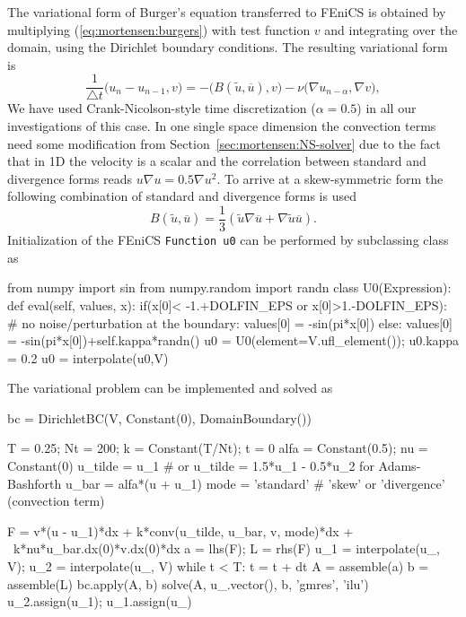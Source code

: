 The variational form of Burger's equation transferred to FEniCS is obtained by multiplying (\eqref{eq:mortensen:burgers}) with test function $v$ and integrating over the domain, using the Dirichlet boundary conditions. The resulting variational form is
\begin{equation}
 \frac{1}{\triangle t}\bigl( u_{n} - u_{n-1} , v\bigr) = - \bigl(B(\tilde{u},\overline{u}), v \bigr) - \nu \bigl( \nabla u_{n-\alpha}, \nabla v \bigr),
\label{eq:mortensen:burgers_vf}
\end{equation}
We have used Crank-Nicolson-style time discretization ($\alpha=0.5$) in all our investigations of this case. In one single space dimension the convection terms need some modification from Section~\ref{sec:mortensen:NS-solver} due to the fact that in 1D the velocity is a scalar and the correlation between standard and divergence forms reads $u\nabla u =0.5 \nabla u^2$. To arrive at a skew-symmetric form the following combination of standard and divergence forms is used
\begin{equation}
 B(\tilde{u},\overline{u}) = \frac{1}{3}\left( \tilde{u}\nabla \overline{u} + \nabla \tilde{u} \overline{u} \right).
\end{equation}
Initialization of the FEniCS
{\fontsize{12pt}{12pt}\texttt{Function u0}} can be performed by subclassing  class
 as
\begin{python}
from numpy import sin
from numpy.random import randn
class U0(Expression):
    def eval(self, values, x):
        if(x[0]< -1.+DOLFIN_EPS or x[0]>1.-DOLFIN_EPS):
            # no noise/perturbation at the boundary:
            values[0] = -sin(pi*x[0])
        else:
            values[0] = -sin(pi*x[0])+self.kappa*randn()
u0 = U0(element=V.ufl_element()); u0.kappa = 0.2
u0 = interpolate(u0,V)
\end{python}
The variational problem can be implemented and solved as
\begin{python}
bc = DirichletBC(V, Constant(0), DomainBoundary())

T = 0.25; Nt = 200; k = Constant(T/Nt); t = 0
alfa = Constant(0.5); nu = Constant(0)
u_tilde = u_1 # or u_tilde = 1.5*u_1 - 0.5*u_2 for Adams-Bashforth
u_bar = alfa*(u + u_1)
mode = 'standard'  # 'skew' or 'divergence' (convection term)

F = v*(u - u_1)*dx + k*conv(u_tilde, u_bar, v, mode)*dx + \
    k*nu*u_bar.dx(0)*v.dx(0)*dx
a = lhs(F); L = rhs(F)
u_1 = interpolate(u_, V); u_2 = interpolate(u_, V)
while t < T:
    t = t + dt
    A = assemble(a)
    b = assemble(L)
    bc.apply(A, b)
    solve(A, u_.vector(), b, 'gmres', 'ilu')
    u_2.assign(u_1); u_1.assign(u_)
\end{python}

